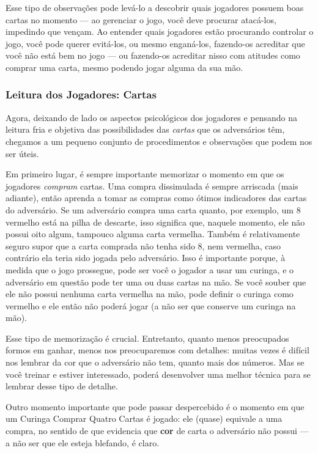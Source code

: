 Esse tipo de observações pode levá-lo a descobrir quais jogadores possuem boas cartas no momento --- ao gerenciar o jogo, você deve procurar atacá-los, impedindo que vençam. Ao entender quais jogadores estão procurando controlar o jogo, você pode querer evitá-los, ou mesmo enganá-los, fazendo-os acreditar que você não está bem no jogo --- ou fazendo-os acreditar nisso com atitudes como comprar uma carta, mesmo podendo jogar alguma da sua mão.

\subsubsection{Leitura dos Jogadores: Cartas}

Agora, deixando de lado os aspectos psicológicos dos jogadores e pensando na leitura fria e objetiva das possibilidades das \textit{cartas} que os adversários têm, chegamos a um pequeno conjunto de procedimentos e observações que podem nos ser úteis.

Em primeiro lugar, é sempre importante memorizar o momento em que os jogadores \textit{compram} cartas. Uma compra dissimulada é sempre arriscada (mais adiante), então aprenda a tomar as compras como ótimos indicadores das cartas do adversário. Se um adversário compra uma carta quanto, por exemplo, um 8 vermelho está na pilha de descarte, isso significa que, naquele momento, ele não possui oito algum, tampouco alguma carta vermelha. Também é relativamente seguro supor que a carta comprada não tenha sido 8, nem vermelha, caso contrário ela teria sido jogada pelo adversário. Isso é importante porque, à medida que o jogo prossegue, pode ser você o jogador a usar um curinga, e o adversário em questão pode ter uma ou duas cartas na mão. Se você souber que ele não possui nenhuma carta vermelha na mão, pode definir o curinga como vermelho e ele então não poderá jogar (a não ser que conserve um curinga na mão).

Esse tipo de memorização é crucial. Entretanto, quanto menos preocupados formos em ganhar, menos nos preocuparemos com detalhes: muitas vezes é difícil nos lembrar da cor que o adversário não tem, quanto mais dos números. Mas se você treinar e estiver interessado, poderá desenvolver uma melhor técnica para se lembrar desse tipo de detalhe.

Outro momento importante que pode passar despercebido é o momento em que um Curinga Comprar Quatro Cartas é jogado: ele (quase) equivale a uma compra, no sentido de que evidencia que \textbf{cor} de carta o adversário não possui --- a não ser que ele esteja blefando, é claro.

